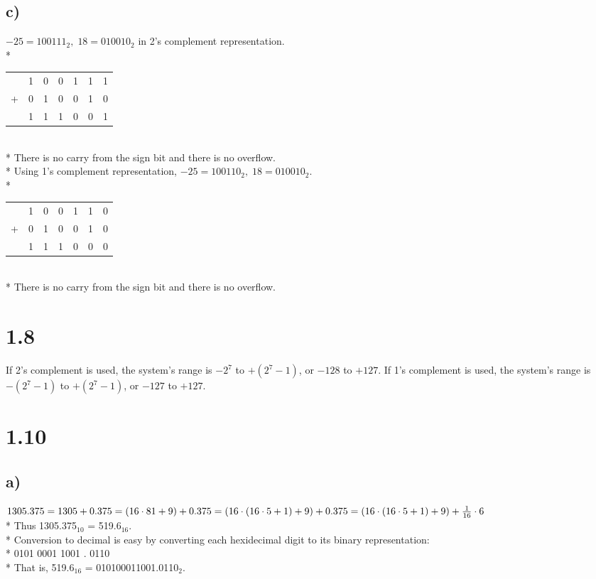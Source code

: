 \documentclass{article}
\begin{document}
\subsection{c)}
$-25 = 100111_2,\; 18 = 010010_2$ in 2's complement representation.
\\*
\begin{tabular}{c@{\,}c@{\,}c@{\,}c@{\,}c@{\,}c@{\,}c}
  &1&0&0&1&1&1 \\
+ &0&1&0&0&1&0 \\
\hline
  &1&1&1&0&0&1 \\
\end{tabular}
\\*
There is no carry from the sign bit and there is no overflow.
\\*
Using 1's complement representation, $-25 = 100110_2,\; 18 = 010010_2$.
\\*
\begin{tabular}{c@{\,}c@{\,}c@{\,}c@{\,}c@{\,}c@{\,}c}
  &1&0&0&1&1&0 \\
+ &0&1&0&0&1&0 \\
\hline
  &1&1&1&0&0&0 \\
\end{tabular}
\\*
There is no carry from the sign bit and there is no overflow.


\section{1.8}
If 2's complement is used, the system's range is
$-2^7$ to $+(2^7 - 1)$, or $-128$ to $+127$.
If 1's complement is used, the system's range is
$-(2^7 - 1)$ to $+(2^7 - 1)$, or $-127$ to $+127$.


\section{1.10}
\subsection{a)}
$1305.375
\\*
= 1305 + 0.375
\\*
= (16 \cdot 81 + 9) + 0.375
\\*
= (16 \cdot (16 \cdot 5 + 1) + 9) + 0.375
\\*
= (16 \cdot (16 \cdot 5 + 1) + 9) +
    \frac{1}{16} \cdot 6$
\\*
Thus 1305.375$_{10}$ = 519.6$_{16}$.
\\*
Conversion to decimal is easy by converting each hexidecimal
digit to its binary representation:
\\*
0101 0001 1001 . 0110
\\*
That is,
519.6$_{16}$ = 010100011001.0110$_2$.
\end{document}
